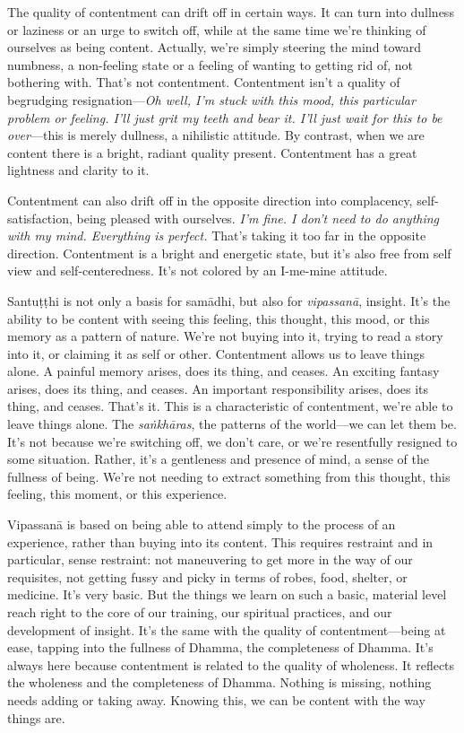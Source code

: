 The quality of contentment can drift off in certain ways. It can turn 
into dullness or laziness or an urge to switch off, while at the same 
time we're thinking of ourselves as being content. Actually, we're 
simply steering the mind toward numbness, a non-feeling state or a 
feeling of wanting to getting rid of, not bothering with. That's not 
contentment. Contentment isn't a quality of begrudging 
resignation---\emph{Oh well, I'm stuck with this mood, this particular 
problem or feeling. I'll just grit my teeth and bear it. I'll just wait 
for this to be over}---this is merely dullness, a nihilistic attitude. 
By contrast, when we are content there is a bright, radiant quality 
present. Contentment has a great lightness and clarity to it.

Contentment can also drift off in the opposite direction into 
complacency, self-satisfaction, being pleased with ourselves. \emph{I'm 
fine. I don't need to do anything with my mind. Everything is perfect.} 
That's taking it too far in the opposite direction. Contentment is a 
bright and energetic state, but it's also free from self view and 
self-centeredness. It's not colored by an I-me-mine attitude.

Santuṭṭhi is not only a basis for samādhi, but also for 
\emph{vipassanā}, insight. It's the ability to be content with seeing 
this feeling, this thought, this mood, or this memory as a pattern of 
nature. We're not buying into it, trying to read a story into it, or 
claiming it as self or other. Contentment allows us to leave things 
alone. A painful memory arises, does its thing, and ceases. An exciting 
fantasy arises, does its thing, and ceases. An important responsibility 
arises, does its thing, and ceases. That's it. This is a characteristic 
of contentment, we're able to leave things alone. The 
\emph{saṅkhāras}, the patterns of the world---we can let them be. 
It's not because we're switching off, we don't care, or we're 
resentfully resigned to some situation. Rather, it's a gentleness and 
presence of mind, a sense of the fullness of being. We're not needing 
to extract something from this thought, this feeling, this moment, or 
this experience.

Vipassanā is based on being able to attend simply to the process of an 
experience, rather than buying into its content. This requires 
restraint and in particular, sense restraint: not maneuvering to get 
more in the way of our requisites, not getting fussy and picky in terms 
of robes, food, shelter, or medicine. It's very basic. But the things 
we learn on such a basic, material level reach right to the core of our 
training, our spiritual practices, and our development of insight. It's 
the same with the quality of contentment---being at ease, tapping into 
the fullness of Dhamma, the completeness of Dhamma. It's always here 
because contentment is related to the quality of wholeness. It reflects 
the wholeness and the completeness of Dhamma. Nothing is missing, 
nothing needs adding or taking away. Knowing this, we can be content 
with the way things are.


